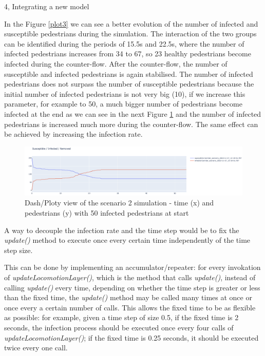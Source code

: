 \documentclass[10pt,a4paper]{article}
\begin{document}
\begin{task}{4, Integrating a new model}
\newpage

In the Figure \ref{plot3} we can see a better evolution of the number of infected and susceptible pedestrians during the simulation. The interaction of the two groups can be identified during the periods of 15.5s and 22.5s, where the number of infected pedestrians increases from 34 to 67, so 23 healthy pedestrians become infected during the counter-flow. After the counter-flow, the number of susceptible and infected pedestrians is again stabilised. The number of infected pedestrians does not surpass the number of susceptible pedestrians because the initial number of infected pedestrians is not very big (10), if we increase this parameter, for example to 50, a much bigger number of pedestrians become infected at the end as we can see in the next Figure \ref{plot4} and the number of infected pedestrians is increased much more during the counter-flow. The same effect can be achieved by increasing the infection rate.

\begin{figure} [H]
    \includegraphics[width=15cm]{images/plot4.png}
    \centering
    \caption{Dash/Ploty view of the scenario 2 simulation - time (x) and pedestrians (y) with 50 infected pedestrians at start}
    \label{plot4}
\end{figure}


A way to decouple the infection rate and the time step would be to fix the \textit{update()} method to execute once every certain time independently of the time step size.

This can be done by implementing an accumulator/repeater: for every invokation of \textit{updateLocomotionLayer()}, which is the method that calls \textit{update()}, instead of calling \textit{update()} every time, depending on whether the time step is greater or less than the fixed time, the \textit{update()} method may be called many times at once or once every a certain number of calls. This allows the fixed time to be as flexible as possible: for example, given a time step of size 0.5, if the fixed time is 2 seconds, the infection process should be executed once every four calls of \textit{updateLocomotionLayer()}; if the fixed time is 0.25 seconds, it should be executed twice every one call.


\end{task}
\end{document}
